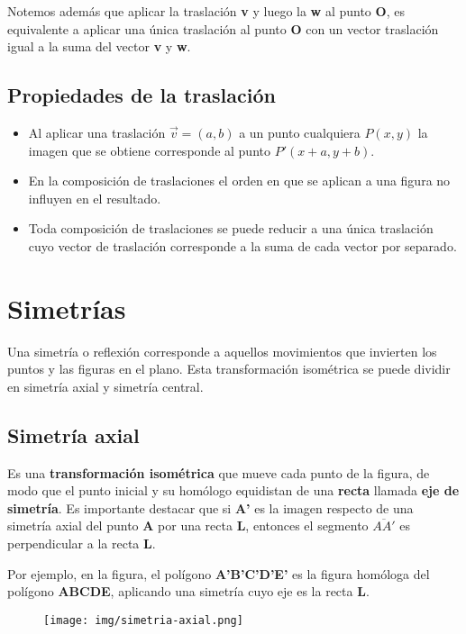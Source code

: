 Notemos además que aplicar la traslación \textbf{v} y luego la \textbf{w} al punto \textbf{O}, es equivalente a aplicar una única traslación al punto \textbf{O} con un vector traslación igual a la suma del vector \textbf{v} y \textbf{w}.\\

\subsection{Propiedades de la traslación}
\begin{itemize}
	\item Al aplicar una traslación $\vec{v}=(a,b)$ a un punto cualquiera $P(x,y)$ la imagen que se obtiene corresponde al \linebreak punto $P'(x+a,y+b)$.
	\item En la composición de traslaciones el orden en que se aplican a una figura no influyen en el resultado.
	\item Toda composición de traslaciones se puede reducir a una única traslación cuyo vector de traslación corresponde a la suma de cada vector por separado.
\end{itemize}

\section{Simetrías}


Una  simetría o reflexión corresponde a aquellos movimientos que invierten los puntos y las figuras en el plano. Esta transformación isométrica se puede dividir en simetría axial y simetría central. 

\subsection{Simetría axial}
Es una \textbf{transformación isométrica} que mueve cada punto de la figura, de modo que el punto inicial y su homólogo equidistan de una \textbf{recta} llamada \textbf{eje de simetría}. Es importante destacar que si \textbf{A'} es la imagen respecto de una simetría axial del punto \textbf{A} por una recta \textbf{L}, entonces el segmento $\overline{AA'}$ es perpendicular a la recta \textbf{L}.

Por ejemplo, en la figura, el polígono \textbf{A'B'C'D'E'} es la figura homóloga del polígono \textbf{ABCDE}, aplicando una simetría cuyo eje es la recta \textbf{L}.

\begin{figure}[hbt!]
	\centering
	\texttt{[image: img/simetria-axial.png]}
\end{figure}


